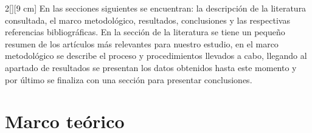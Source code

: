 \documentclass[letterpaper, 10 pt]{article}
\begin{document}
\begin{multicols}{2}[][9 cm]
En las secciones siguientes se encuentran: la descripción de la literatura consultada, el marco metodológico, resultados, conclusiones y las respectivas referencias bibliográficas. En la sección de la literatura se tiene un pequeño resumen de los artículos más relevantes para nuestro estudio, en el marco metodológico se describe el proceso y procedimientos llevados a cabo, llegando al apartado de resultados se presentan los datos obtenidos hasta este momento y por último se finaliza con una sección para presentar conclusiones.


\section{Marco teórico}
%


\end{multicols}
\end{document}
